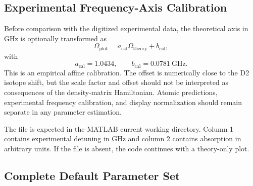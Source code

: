 \subsection{Experimental Frequency-Axis Calibration}
\label{subsec:dm_axis_calibration}

Before comparison with the digitized experimental data, the theoretical axis
in GHz is optionally transformed as
\begin{equation}
\Omega_{\mathrm{plot}}
=
a_{\mathrm{cal}}\Omega_{\mathrm{theory}}+b_{\mathrm{cal}},
\label{eq:axis_calibration}
\end{equation}
with
\begin{equation}
a_{\mathrm{cal}}=1.0434,
\qquad
b_{\mathrm{cal}}=0.0781~\mathrm{GHz}.
\end{equation}
This is an empirical affine calibration.  The offset is numerically close to
the D2 isotope shift, but the scale factor and offset should not be interpreted
as consequences of the density-matrix Hamiltonian.  Atomic predictions,
experimental frequency calibration, and display normalization should remain
separate in any parameter estimation.

The file  is expected in the MATLAB current working
directory.  Column 1 contains experimental detuning in GHz and column 2
contains absorption in arbitrary units.  If the file is absent, the code
continues with a theory-only plot.

\clearpage
\subsection{Complete Default Parameter Set}
\label{subsec:dm_parameters}

